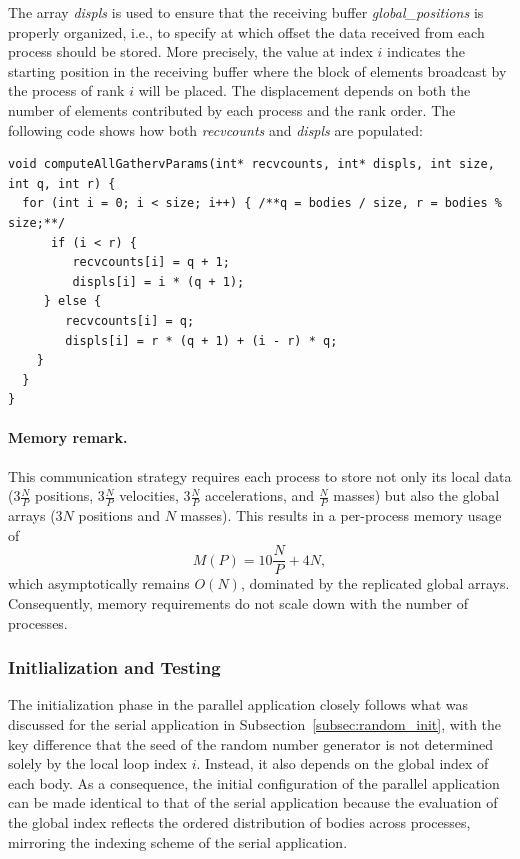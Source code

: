 \documentclass{article}
\begin{document}
The array \emph{displs} is used to ensure that the receiving buffer \emph{global\_positions} is properly organized, i.e., to specify at which offset the data received from each process should be stored.
More precisely, the value at index $i$ indicates the starting position in the receiving buffer where the block of elements broadcast by the process of rank $i$ will be placed. The displacement depends on both the number of elements contributed by each process and the rank order.
The following code shows how both \emph{recvcounts} and \emph{displs} are populated:
\begin{lstlisting}
void computeAllGathervParams(int* recvcounts, int* displs, int size, int q, int r) {
  for (int i = 0; i < size; i++) { /**q = bodies / size, r = bodies % size;**/
      if (i < r) {
         recvcounts[i] = q + 1;
         displs[i] = i * (q + 1);
     } else {
        recvcounts[i] = q;
        displs[i] = r * (q + 1) + (i - r) * q;
    }
  }
}
\end{lstlisting}

\paragraph{Memory remark.}
This communication strategy requires each process to store not only its local data ($3\frac{N}{P}$ positions, $3\frac{N}{P}$ velocities, $3\frac{N}{P}$ accelerations, and $\tfrac{N}{P}$ masses) but also the global arrays ($3N$ positions and $N$ masses).  
This results in a per-process memory usage of
\[
M(P) = 10\frac{N}{P} + 4N,
\]
which asymptotically remains $O(N)$, dominated by the replicated global arrays.
Consequently, memory requirements do not scale down with the number of processes.

\subsubsection{Initlialization and Testing}
The initialization phase in the parallel application closely follows what was discussed for the serial application in Subsection~\ref{subsec:random_init}, with the key difference that the seed of the random number generator is not determined solely by the local loop index $i$. Instead, it also depends on the global index of each body.
As a consequence, the initial configuration of the parallel application can be made identical to that of the serial application because the evaluation of the global index reflects the ordered distribution of bodies across processes, mirroring the indexing scheme of the serial application.
 
\end{document}
